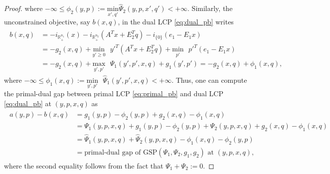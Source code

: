 \documentclass[envcountsame]{llncs} %
\begin{document}
\begin{proof}
where $-\infty \le \phi_2(y, p) := \underset{x',q'}{\text{min}}\text{
}\hat{\Psi}_2(y, p, x', q') < +\infty$.
Similarly, the unconstrained objective, say
$b(x, q)$, in the dual LCP \eqref{eq:dual_pb} writes
\begin{eqnarray*}
  \begin{aligned}
 b(x, q) &= 
 -i_{\mathbb{R}^{n_1}_+}(x) - i_{\mathbb{R}^{n_2}_+}(A^Tx+E_2^Tq) -
 i_{\{0\}}(e_1 - E_1x)\\
    &= -g_2(x, q) + \underset{y' \geq
   0}{\text{min}}\text{ }y'^T(A^Tx + E_2^Tq) +
 \underset{p'}{\text{min}}\text{ }p'^T(e_1-E_1x)\\
    &= -g_2(x, q)
 +\underset{y',p'}{\text{max}}\text{ }\Psi_1(y', p', x, q) +
 g_1(y', p') = -g_2(x, q) + \phi_1(x, q),
   \end{aligned}
\end{eqnarray*}
where $-\infty \le \phi_1(x, q) :=
\underset{y',p'}{\text{min}}\text{ }\hat{\Psi}_1(y', p', x, q) < +\infty$.
Thus, one can compute the primal-dual gap between primal LCP
\eqref{eq:primal_pb} and dual LCP \eqref{eq:dual_pb} at $(y, p, x, q)$ as
\begin{eqnarray*}
  \begin{split}
  a(y, p) - b(x, q) &= g_1(y, p) - \phi_2(y, p) + g_2(x, q) - \phi_1(x,
  q) \\
  &= \Psi_1(y, p, x, q) +  g_1(y, p) - \phi_2(y, p) + \Psi_2(y, p, x,
  q) + g_2(x, q) - \phi_1(x, q)\\
  &= \hat{\Psi}_1(y, p, x, q) + \hat{\Psi}_2(y, p, x, q) - \phi_1(x,
  q) - \phi_2(y, p)\\
  &= \text{primal-dual gap of GSP}(\Psi_1, \Psi_2,
  g_1, g_2) \text{ at }(y, p, x, q),
  \end{split}
\end{eqnarray*}
where the second equality follows from the fact that $\Psi_1 + \Psi_2
:= 0$.



\end{proof}
\end{document}
